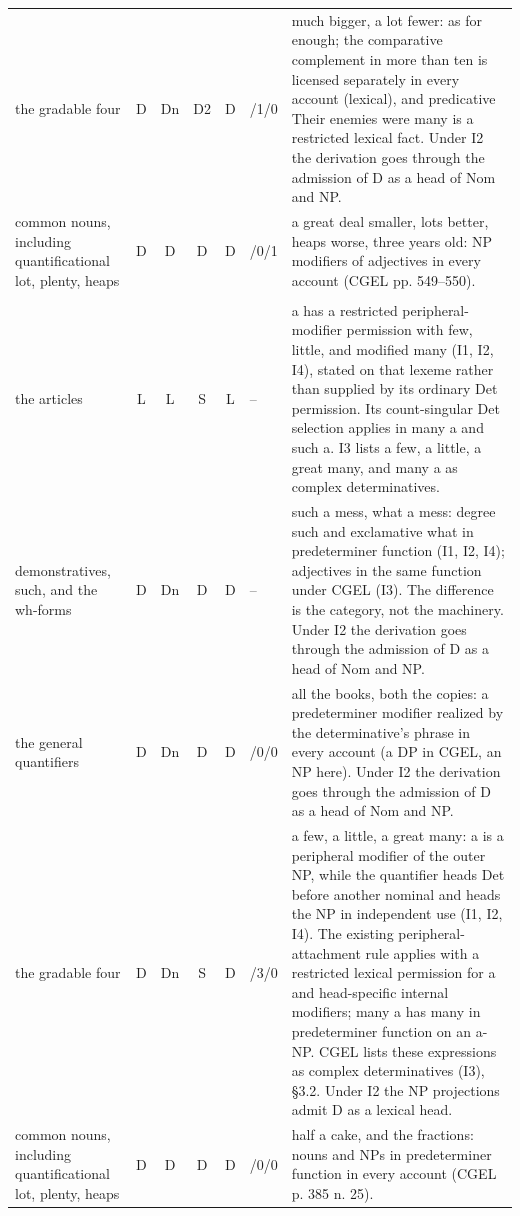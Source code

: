 {\begin{longtable}{>{\raggedright\arraybackslash}p{2.2cm}cccc>{\raggedright\arraybackslash}p{1.0cm}>{\raggedright\arraybackslash}p{7.2cm}}
the gradable four & D & Dn & D2 & D & 4/1/0 & much bigger, a lot fewer: as for enough; the comparative complement in more than ten is licensed separately in every account (lexical), and predicative Their enemies were many is a restricted lexical fact. Under I2 the derivation goes through the admission of D as a head of Nom and NP. \\
common nouns, including quantificational lot, plenty, heaps & D & D & D & D & 13/0/1 & a great deal smaller, lots better, heaps worse, three years old: NP modifiers of adjectives in every account (CGEL pp. 549–550). \\
\multicolumn{7}{l}{\itshape predeterminer and restricted peripheral modification; the former complex determinatives (§3.2)} \\
the articles & L & L & S & L & -- & a has a restricted peripheral-modifier permission with few, little, and modified many (I1, I2, I4), stated on that lexeme rather than supplied by its ordinary Det permission. Its count-singular Det selection applies in many a and such a. I3 lists a few, a little, a great many, and many a as complex determinatives. \\
demonstratives, such, and the wh-forms & D & Dn & D & D & -- & such a mess, what a mess: degree such and exclamative what in predeterminer function (I1, I2, I4); adjectives in the same function under CGEL (I3). The difference is the category, not the machinery. Under I2 the derivation goes through the admission of D as a head of Nom and NP. \\
the general quantifiers & D & Dn & D & D & 2/0/0 & all the books, both the copies: a predeterminer modifier realized by the determinative's phrase in every account (a DP in CGEL, an NP here). Under I2 the derivation goes through the admission of D as a head of Nom and NP. \\
the gradable four & D & Dn & S & D & 0/3/0 & a few, a little, a great many: a is a peripheral modifier of the outer NP, while the quantifier heads Det before another nominal and heads the NP in independent use (I1, I2, I4). The existing peripheral-attachment rule applies with a restricted lexical permission for a and head-specific internal modifiers; many a has many in predeterminer function on an a-NP. CGEL lists these expressions as complex determinatives (I3), §3.2. Under I2 the NP projections admit D as a lexical head. \\
common nouns, including quantificational lot, plenty, heaps & D & D & D & D & 1/0/0 & half a cake, and the fractions: nouns and NPs in predeterminer function in every account (CGEL p. 385 n. 25). \\

\end{longtable}}
